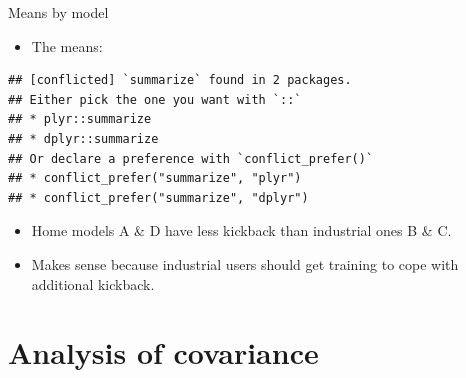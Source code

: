 \documentclass[ignorenonframetext,]{beamer}
\newenvironment{Shaded}{\begin{snugshade}}{\end{snugshade}}
\newcommand{\DataTypeTok}[1]{\textcolor[rgb]{0.13,0.29,0.53}{#1}}
\newcommand{\KeywordTok}[1]{\textcolor[rgb]{0.13,0.29,0.53}{\textbf{#1}}}
\newcommand{\NormalTok}[1]{#1}
\newcommand{\OperatorTok}[1]{\textcolor[rgb]{0.81,0.36,0.00}{\textbf{#1}}}
\newcommand{\StringTok}[1]{\textcolor[rgb]{0.31,0.60,0.02}{#1}}
\providecommand{\tightlist}{%
  \setlength{\itemsep}{0pt}\setlength{\parskip}{0pt}}
\begin{document}
\begin{frame}[fragile]{Means by model}
\protect\hypertarget{means-by-model}{}

\begin{itemize}
\tightlist
\item
  The means:
\end{itemize}

\footnotesize

\begin{Shaded}
\end{Shaded}

\begin{verbatim}
## [conflicted] `summarize` found in 2 packages.
## Either pick the one you want with `::` 
## * plyr::summarize
## * dplyr::summarize
## Or declare a preference with `conflict_prefer()`
## * conflict_prefer("summarize", "plyr")
## * conflict_prefer("summarize", "dplyr")
\end{verbatim}

\normalsize

\begin{itemize}
\item
  Home models A \& D have less kickback than industrial ones B \& C.
\item
  Makes sense because industrial users should get training to cope with
  additional kickback.
\end{itemize}

\end{frame}

\hypertarget{analysis-of-covariance}{%
\section{Analysis of covariance}\label{analysis-of-covariance}}
\end{document}
